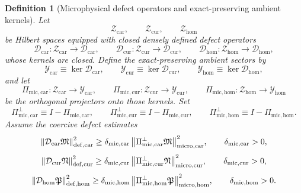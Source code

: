 \documentclass[11pt]{article}
\newcommand{\ProtoTensorClass}{\mathscr Y_{\mathrm{car}}}
\newcommand{\ProtoRelabelClass}{\mathscr Y_{\mathrm{cur}}}
\newcommand{\ProtoFreeClass}{\mathscr Y_{\mathrm{hom}}}
\newcommand{\UltraTensorClass}{\mathscr Z_{\mathrm{car}}}
\newcommand{\UltraRelabelClass}{\mathscr Z_{\mathrm{cur}}}
\newcommand{\UltraFreeClass}{\mathscr Z_{\mathrm{hom}}}
\newcommand{\UltraTensor}{\mathfrak M}
\newcommand{\UltraRelabel}{\mathfrak N}
\newcommand{\UltraFree}{\mathfrak P}
\newcommand{\UltraCarProj}{\Pi_{\mathrm{mic,car}}}
\newcommand{\UltraCurProj}{\Pi_{\mathrm{mic,cur}}}
\newcommand{\UltraHomProj}{\Pi_{\mathrm{mic,hom}}}
\newcommand{\UltraCarPerp}{\Pi_{\mathrm{mic,car}}^{\perp}}
\newcommand{\UltraCurPerp}{\Pi_{\mathrm{mic,cur}}^{\perp}}
\newcommand{\UltraHomPerp}{\Pi_{\mathrm{mic,hom}}^{\perp}}
\newcommand{\UltraCarGap}{\delta_{\mathrm{mic,car}}}
\newcommand{\UltraCurGap}{\delta_{\mathrm{mic,cur}}}
\newcommand{\UltraHomGap}{\delta_{\mathrm{mic,hom}}}
\newcommand{\TensorDefect}{\mathcal D_{\mathrm{car}}}
\newcommand{\CurDefect}{\mathcal D_{\mathrm{cur}}}
\newcommand{\HomDefect}{\mathcal D_{\mathrm{hom}}}
\newtheorem{definition}{Definition}
\begin{document}
\begin{definition}[Microphysical defect operators and exact-preserving ambient kernels]
\label{def:ultra}
Let
\[
\UltraTensorClass,\qquad
\UltraRelabelClass,\qquad
\UltraFreeClass
\]
be Hilbert spaces equipped with closed densely defined defect operators
\begin{equation}
\TensorDefect:\UltraTensorClass\to\mathscr D_{\mathrm{car}},
\qquad
\CurDefect:\UltraRelabelClass\to\mathscr D_{\mathrm{cur}},
\qquad
\HomDefect:\UltraFreeClass\to\mathscr D_{\mathrm{hom}},
\label{eq:defects}
\end{equation}
whose kernels are closed. Define the exact-preserving ambient sectors by
\begin{equation}
\ProtoTensorClass\equiv \ker\TensorDefect,
\qquad
\ProtoRelabelClass\equiv \ker\CurDefect,
\qquad
\ProtoFreeClass\equiv \ker\HomDefect,
\label{eq:proto_kernels}
\end{equation}
and let
\begin{equation}
\UltraCarProj:\UltraTensorClass\to\ProtoTensorClass,
\qquad
\UltraCurProj:\UltraRelabelClass\to\ProtoRelabelClass,
\qquad
\UltraHomProj:\UltraFreeClass\to\ProtoFreeClass
\label{eq:ultra_proj}
\end{equation}
be the orthogonal projectors onto those kernels. Set
\begin{equation}
\UltraCarPerp\equiv I-\UltraCarProj,
\qquad
\UltraCurPerp\equiv I-\UltraCurProj,
\qquad
\UltraHomPerp\equiv I-\UltraHomProj.
\label{eq:ultra_perp}
\end{equation}
Assume the coercive defect estimates
\begin{equation}
\norm{\TensorDefect\UltraTensor}_{\mathrm{def,car}}^2
\ge
\UltraCarGap\,\norm{\UltraCarPerp\UltraTensor}_{\mathrm{micro,car}}^2,
\qquad
\UltraCarGap>0,
\label{eq:defect_car}
\end{equation}
\begin{equation}
\norm{\CurDefect\UltraRelabel}_{\mathrm{def,cur}}^2
\ge
\UltraCurGap\,\norm{\UltraCurPerp\UltraRelabel}_{\mathrm{micro,cur}}^2,
\qquad
\UltraCurGap>0,
\label{eq:defect_cur}
\end{equation}
\begin{equation}
\norm{\HomDefect\UltraFree}_{\mathrm{def,hom}}^2
\ge
\UltraHomGap\,\norm{\UltraHomPerp\UltraFree}_{\mathrm{micro,hom}}^2,
\qquad
\UltraHomGap>0.
\label{eq:defect_hom}
\end{equation}
\end{definition}
\end{document}
